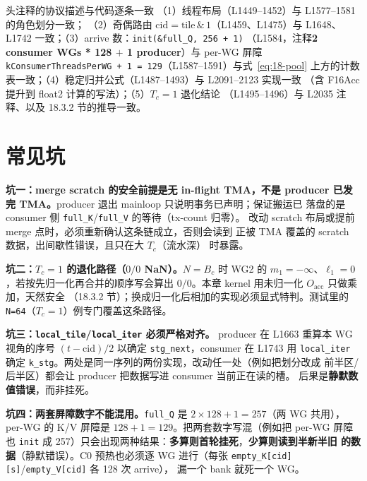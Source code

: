 \begin{kaogu}[F1/F3 核校通过]{头注释的协议描述与代码逐条一致}
  （1）线程布局（L1449--1452）与 L1577--1581 的角色划分一致；
  （2）奇偶路由 $\mathrm{cid} = \mathrm{tile}\,\&\,1$（L1459、L1475）与
  L1648、L1742 一致；（3）arrive 数：\texttt{init\allowbreak{}(\&full\_\allowbreak{}Q,\allowbreak{} 256 + 1)}
  （L1584，注释\textbf{2 consumer WGs * 128 $+$ 1 producer}）与 per-WG 屏障
  \texttt{k\allowbreak{}Consumer\allowbreak{}Threads\allowbreak{}Per\allowbreak{}WG + 1 =\allowbreak{} 129}（L1587--1591）与式~\ref{eq:18-pool}
  上方的计数表一致；（4）稳定归并公式（L1487--1493）与 L2091--2123 实现一致
  （含 F16Acc 提升到 float2 计算的写法）；（5）$T_c{=}1$ 退化结论
  （L1495--1496）与 L2035 注释、以及 18.3.2 节的推导一致。
\end{kaogu}

\section{常见坑}

\textbf{坑一：merge scratch 的安全前提是无 in-flight TMA，不是 producer 已发完
TMA。}\allowbreak{}producer 退出 mainloop 只说明事务已声明；保证搬运已
落盘的是 consumer 侧 \texttt{full\_K}/\texttt{full\_V} 的等待（tx-count 归零）。
改动 scratch 布局或提前 merge 点时，必须重新确认这条链成立，否则会读到
正被 TMA 覆盖的 scratch 数据，出间歇性错误，且只在大 $T_c$（流水深）
时暴露。

\textbf{坑二：$T_c = 1$ 的退化路径（$0/0$ NaN）。}$N = B_c$ 时 WG2 的
$m_1 = -\infty$、$\ell_1 = 0$，若按先归一化再合并的顺序写会算出
$0/0$。本章 kernel 用未归一化 $O_{\mathrm{acc}}$ 只做乘加，天然安全
（18.3.2 节）；换成归一化后相加的实现必须显式特判。测试里的
\texttt{N=64}（$T_c{=}1$）例专门覆盖这条路径。

\textbf{坑三：\texttt{local\_tile}/\texttt{local\_iter} 必须严格对齐。}
producer 在 L1663 重算本 WG 视角的序号 $(t-\mathrm{cid})/2$ 以确定
\texttt{stg\_next}，consumer 在 L1743 用 \texttt{local\_iter} 确定
\texttt{k\_stg}。两处是同一序列的两份实现，改动任一处（例如把划分改成
前半区/后半区）都会让 producer 把数据写进 consumer 当前正在读的槽。
后果是\textbf{静默数值错误}，而非挂死。

\textbf{坑四：两套屏障数字不能混用。}\texttt{full\_Q} 是
$2 \times 128 + 1 = 257$（两 WG 共用），per-WG 的 K/V 屏障是
$128 + 1 = 129$。把两套数字写混（例如把 per-WG 屏障也 \texttt{init} 成
257）只会出现两种结果：\textbf{多算则首轮挂死}，\textbf{少算则读到半新半旧
的数据}（静默错误）。C0 预热也必须逐 WG 进行（每张
\texttt{empty\_\allowbreak{}K[cid][s]}/\texttt{empty\_\allowbreak{}V[cid]} 各 128 次 arrive），
漏一个 bank 就死一个 WG。

